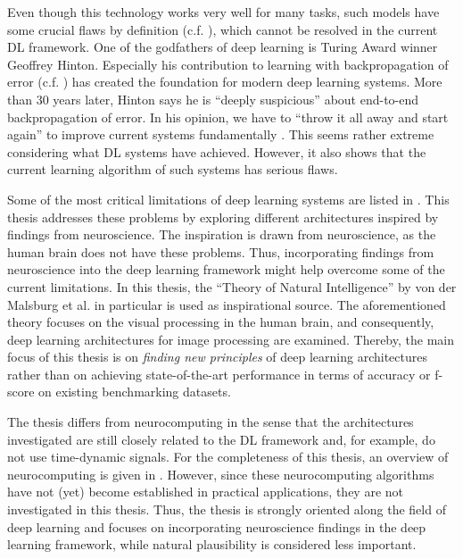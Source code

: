 Even though this technology works very well for many tasks, such models have some crucial flaws by definition (c.f. ), which cannot be resolved in the current DL framework.
One of the godfathers of deep learning is Turing Award winner Geoffrey Hinton. 
Especially his contribution to learning with backpropagation of error (c.f. ) has created the foundation for modern deep learning systems.
More than 30 years later, Hinton says he is ``deeply suspicious'' about end-to-end backpropagation of error. In his opinion, we have to ``throw it all away and start again'' to improve current systems fundamentally .
This seems rather extreme considering what DL systems have achieved.
However, it also shows that the current learning algorithm of such systems has serious flaws.

Some of the most critical limitations of deep learning systems are listed in .
This thesis addresses these problems by exploring different architectures inspired by findings from neuroscience.
The inspiration is drawn from neuroscience, as the human brain does not have these problems. Thus, incorporating findings from neuroscience into the deep learning framework might help overcome some of the current limitations.
In this thesis, the ``Theory of Natural Intelligence'' by von der Malsburg et al.  in particular is used as inspirational source.
The aforementioned theory focuses on the visual processing in the human brain, and consequently, deep learning architectures for image processing are examined.
Thereby, the main focus of this thesis is on \emph{finding new principles} of deep learning architectures rather than on achieving state-of-the-art performance in terms of accuracy or f-score on existing benchmarking datasets.

The thesis differs from neurocomputing in the sense that the architectures investigated are still closely related to the DL framework and, for example, do not use time-dynamic signals. 
For the completeness of this thesis, an overview of neurocomputing is given in .
However, since these neurocomputing algorithms have not (yet) become established in practical applications, they are not investigated in this thesis.
Thus, the thesis is strongly oriented along the field of deep learning and focuses on incorporating neuroscience findings in the deep learning framework, while natural plausibility is considered less important.


